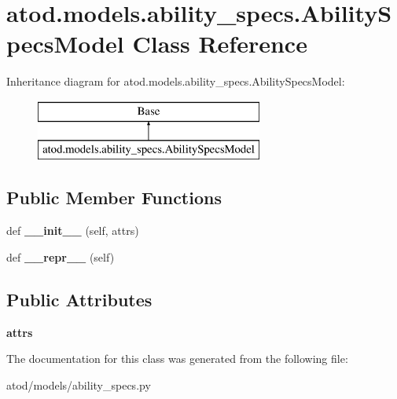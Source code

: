 \hypertarget{classatod_1_1models_1_1ability__specs_1_1_ability_specs_model}{}\section{atod.\+models.\+ability\+\_\+specs.\+Ability\+Specs\+Model Class Reference}
\label{classatod_1_1models_1_1ability__specs_1_1_ability_specs_model}
Inheritance diagram for atod.\+models.\+ability\+\_\+specs.\+Ability\+Specs\+Model\+:\begin{figure}[H]
\begin{center}
\leavevmode
\includegraphics[height=2.000000cm]{classatod_1_1models_1_1ability__specs_1_1_ability_specs_model}
\end{center}
\end{figure}
\subsection*{Public Member Functions}
\begin{DoxyCompactItemize}
\item 
def {\bfseries \+\_\+\+\_\+init\+\_\+\+\_\+} (self, attrs)\hypertarget{classatod_1_1models_1_1ability__specs_1_1_ability_specs_model_aea44d80585948c298878ffa307569e8d}{}\label{classatod_1_1models_1_1ability__specs_1_1_ability_specs_model_aea44d80585948c298878ffa307569e8d}

\item 
def {\bfseries \+\_\+\+\_\+repr\+\_\+\+\_\+} (self)\hypertarget{classatod_1_1models_1_1ability__specs_1_1_ability_specs_model_af8b60a0f2f2b42840b6052045f629d21}{}\label{classatod_1_1models_1_1ability__specs_1_1_ability_specs_model_af8b60a0f2f2b42840b6052045f629d21}

\end{DoxyCompactItemize}
\subsection*{Public Attributes}
\begin{DoxyCompactItemize}
\item 
{\bfseries attrs}\hypertarget{classatod_1_1models_1_1ability__specs_1_1_ability_specs_model_a9fe9609e73c522edb83c871aa26fa3d9}{}\label{classatod_1_1models_1_1ability__specs_1_1_ability_specs_model_a9fe9609e73c522edb83c871aa26fa3d9}

\end{DoxyCompactItemize}


The documentation for this class was generated from the following file\+:\begin{DoxyCompactItemize}
\item 
atod/models/ability\+\_\+specs.\+py\end{DoxyCompactItemize}
